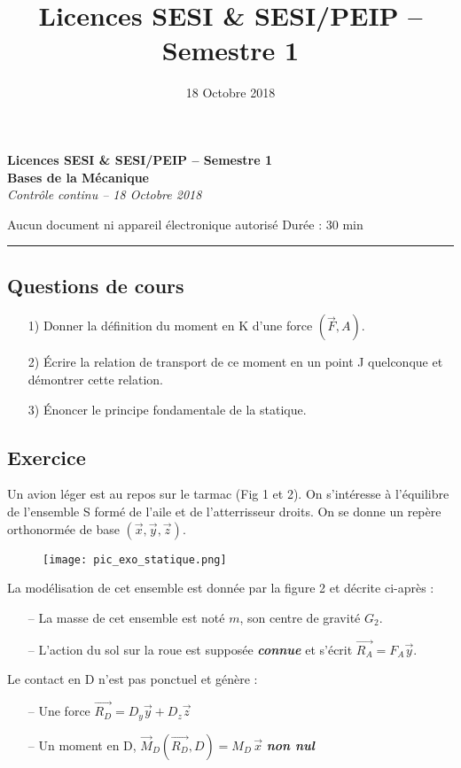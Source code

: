 \documentclass[a4paper,12pt]{article}
\title{\large{Licences SESI \& SESI/PEIP -- Semestre 1}}%
\date{\large{18 Octobre 2018}}
\begin{document}
\begin{center}
	\textbf{Licences SESI \& SESI/PEIP -- Semestre 1} \\[2mm]
	\large{\textbf{Bases de la Mécanique}} \\[1mm]
	\textit{Contrôle continu -- 18 Octobre 2018}
\end{center}
\begin{flushleft}
Aucun document ni appareil électronique autorisé \hfill Durée : 30 min
\end{flushleft}
\hrule
\vspace{2mm}
\subsection*{Questions de cours}
\begin{itemize}
\item[1)] Donner la définition du moment en K d'une force $\left( \vec{F}, A\right)$.
\item[2)] Écrire la relation de transport de ce moment en un point J quelconque et démontrer cette relation.
\item[3)] Énoncer le principe fondamentale de la statique.
\end{itemize}
\subsection*{Exercice}
Un avion léger est au repos sur le tarmac (Fig 1 et 2). On s'intéresse à l'équilibre de l'ensemble S formé de l'aile et de l'atterrisseur droits. On se donne un repère orthonormée de base $\left( \vec{x}, \vec{y}, \vec{z} \right)$.\\

\begin{figure}[!ht]
\centering
\texttt{[image: pic\_exo\_statique.png]}

\end{figure}

La modélisation de cet ensemble est donnée par la figure 2 et décrite ci-après :
\begin{itemize}[leftmargin=2cm]
	\item[--] La masse de cet ensemble est noté $m$, son centre de gravité $G_2$.
	\item[--] L'action du sol sur la roue est supposée \textbf{\textit{connue}} et s'écrit $\vec{R_A} = F_A \vec{y}$.
	\end{itemize}

Le contact en D n'est pas ponctuel et génère : \vspace{1mm}
	\begin{itemize}[leftmargin=2cm]
	\item[--] Une force $\vec{R_D} = D_y \vec{y} + D_z \vec{z}$
	\item[--] Un moment en D, $\vec{M}_D\left( \vec{R_D}, D\right) = M_D\, \vec{x}$ \textbf{\textit{non nul}}
	\end{itemize}
\end{document}
